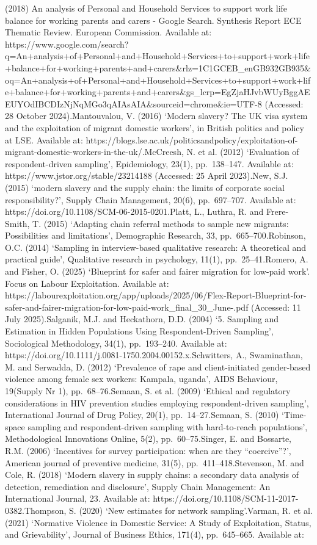 \documentclass[
  12pt,
  letterpaper,
  DIV=11,
  numbers=noendperiod]{scrartcl}
\begin{document}
{{(2018) An analysis of Personal and Household Services to support work life balance for working parents and carers - Google Search. Synthesis Report ECE Thematic Review. European Commission. Available at: https://www.google.com/search?q=An+analysis+of+Personal+and+Household+Services+to+support+work+life+balance+for+working+parents+and+carers\&rlz=1C1GCEB\_enGB932GB935\&oq=An+analysis+of+Personal+and+Household+Services+to+support+work+life+balance+for+working+parents+and+carers\&gs\_lcrp=EgZjaHJvbWUyBggAEEUYOdIBCDIzNjNqMGo3qAIAsAIA\&sourceid=chrome\&ie=UTF-8 (Accessed: 28 October 2024).Mantouvalou, V. (2016) `Modern slavery? The UK visa system and the exploitation of migrant domestic workers', in British politics and policy at LSE. Available at: https://blogs.lse.ac.uk/politicsandpolicy/exploitation-of-migrant-domestic-workers-in-the-uk/.McCreesh, N. et al. (2012) `Evaluation of respondent-driven sampling', Epidemiology, 23(1), pp.~138--147. Available at: https://www.jstor.org/stable/23214188 (Accessed: 25 April 2023).New, S.J. (2015) `modern slavery and the supply chain: the limits of corporate social responsibility?', Supply Chain Management, 20(6), pp.~697--707. Available at: https://doi.org/10.1108/SCM-06-2015-0201.Platt, L., Luthra, R. and Frere-Smith, T. (2015) `Adapting chain referral methods to sample new migrants: Possibilities and limitations', Demographic Research, 33, pp.~665--700.Robinson, O.C. (2014) `Sampling in interview-based qualitative research: A theoretical and practical guide', Qualitative research in psychology, 11(1), pp.~25--41.Romero, A. and Fisher, O. (2025) `Blueprint for safer and fairer migration for low-paid work'. Focus on Labour Exploitation. Available at: https://labourexploitation.org/app/uploads/2025/06/Flex-Report-Blueprint-for-safer-and-fairer-migration-for-low-paid-work\_final\_30\_June-.pdf (Accessed: 11 July 2025).Salganik, M.J. and Heckathorn, D.D. (2004) `5. Sampling and Estimation in Hidden Populations Using Respondent-Driven Sampling', Sociological Methodology, 34(1), pp.~193--240. Available at: https://doi.org/10.1111/j.0081-1750.2004.00152.x.Schwitters, A., Swaminathan, M. and Serwadda, D. (2012) `Prevalence of rape and client-initiated gender-based violence among female sex workers: Kampala, uganda', AIDS Behaviour, 19(Supply Nr 1), pp.~68--76.Semaan, S. et al. (2009) `Ethical and regulatory considerations in HIV prevention studies employing respondent-driven sampling', International Journal of Drug Policy, 20(1), pp.~14--27.Semaan, S. (2010) `Time-space sampling and respondent-driven sampling with hard-to-reach populations', Methodological Innovations Online, 5(2), pp.~60--75.Singer, E. and Bossarte, R.M. (2006) `Incentives for survey participation: when are they ``coercive''?', American journal of preventive medicine, 31(5), pp.~411--418.Stevenson, M. and Cole, R. (2018) `Modern slavery in supply chains: a secondary data analysis of detection, remediation and disclosure', Supply Chain Management: An International Journal, 23. Available at: https://doi.org/10.1108/SCM-11-2017-0382.Thompson, S. (2020) `New estimates for network sampling'.Varman, R. et al. (2021) `Normative Violence in Domestic Service: A Study of Exploitation, Status, and Grievability', Journal of Business Ethics, 171(4), pp.~645--665. Available at: }}
\end{document}
